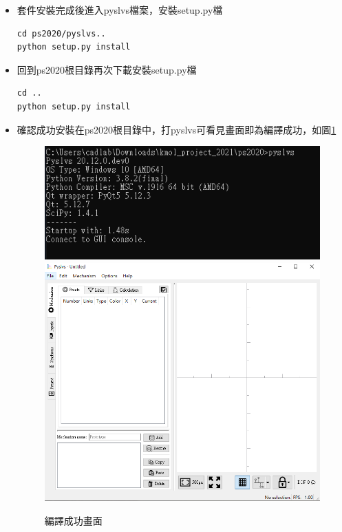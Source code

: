 \documentclass[14pt,a4paper]{report}  %
\begin{document}
{		\begin{itemize}
		\item 套件安裝完成後進入pyslvs檔案，安裝setup.py檔
		\begin{lstlisting}[caption=安裝步驟]
cd ps2020/pyslvs..
python setup.py install
		\end{lstlisting}
		\end{itemize}
		
		\begin{itemize}
		\item 回到ps2020根目錄再次下載安裝setup.py檔
		\begin{lstlisting}[caption=安裝步驟]
cd ..
python setup.py install
		\end{lstlisting}
		\end{itemize}
		
		\begin{itemize}
		\item {確認成功安裝在ps2020根目錄中，打pyslvs可看見畫面即為編譯成功，如圖\ref{fig_pyslvs:scale}}
      \begin{figure}[hbt!]
        \centering
        \includegraphics[scale=0.6]{輸入pyslvs指令.PNG}
        \includegraphics[scale=0.5]{編譯成功畫面.png}
        \caption{編譯成功畫面}
        \label{fig_pyslvs:scale} 
    	\end{figure}
		\end{itemize}
      

}
\end{document}
